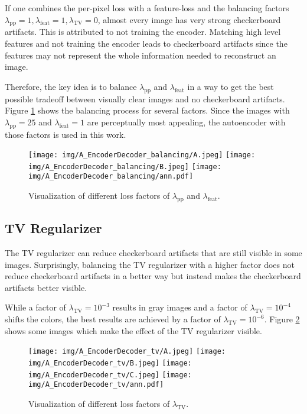 If one combines the per-pixel loss with a feature-loss and the balancing factors $\lambda_{\mathrm{pp}} = 1, \lambda_{\mathrm{feat}}=1, \lambda_{\mathrm{TV}}=0$, almost every image has very strong checkerboard artifacts. This is attributed to not training the encoder. Matching high level features and not training the encoder leads to checkerboard artifacts since the features may not represent the whole information needed to reconstruct an image. 

Therefore, the key idea is to balance $\lambda_{\mathrm{pp}}$ and $\lambda_{\mathrm{feat}}$ in a way to get the best possible tradeoff between visually clear images and no checkerboard artifacts. Figure \ref{fig:A_autoencoder_balancing} shows the balancing process for several factors. Since the images with $\lambda_{\mathrm{pp}} = 25$ and $\lambda_{\mathrm{feat}}=1$ are perceptually most appealing, the autoencoder with those factors is used in this work.
\begin{figure}[!ht]
  	\texttt{[image: img/A\_EncoderDecoder\_balancing/A.jpeg]}
  	\texttt{[image: img/A\_EncoderDecoder\_balancing/B.jpeg]}
  	\texttt{[image: img/A\_EncoderDecoder\_balancing/ann.pdf]}
	\caption{Visualization of different loss factors of $\lambda_{\mathrm{pp}}$ and $\lambda_{\mathrm{feat}}$.}
	\label{fig:A_autoencoder_balancing}
\end{figure}

\subsection{TV Regularizer}
The TV regularizer can reduce checkerboard artifacts that are still visible in some images. Surprisingly, balancing the TV regularizer with a higher factor does not reduce checkerboard artifacts in a better way but instead makes the checkerboard artifacts better visible. 

While a factor of $\lambda_{\mathrm{TV}}=10^{-3}$ results in gray images and a factor of $\lambda_{\mathrm{TV}}=10^{-4}$ shifts the colors, the best results are achieved by a factor of $\lambda_{\mathrm{TV}}=10^{-6}$. Figure \ref{fig:A_autoencoder_balancing_tv} shows some images which make the effect of the TV regularizer visible.
\begin{figure}[!ht]
  	\texttt{[image: img/A\_EncoderDecoder\_tv/A.jpeg]}
  	\texttt{[image: img/A\_EncoderDecoder\_tv/B.jpeg]}
  	\texttt{[image: img/A\_EncoderDecoder\_tv/C.jpeg]}
  	\texttt{[image: img/A\_EncoderDecoder\_tv/ann.pdf]}
	\caption{Visualization of different loss factors of $\lambda_{\mathrm{TV}}$.}
	\label{fig:A_autoencoder_balancing_tv}
\end{figure}

